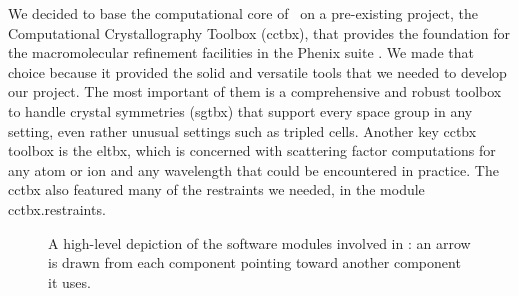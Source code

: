 \documentclass[pdf]{iucr}
\begin{document}
We decided to base the computational core of \olexrefine\ on a pre-existing project, the Computational Crystallography Toolbox (cctbx), that provides the foundation for the macromolecular refinement facilities in the Phenix suite . We made that choice because it provided the solid and versatile tools  that we needed to develop our project. The most important of them is a comprehensive and robust toolbox to handle crystal symmetries (sgtbx) that support every space group in any setting, even rather unusual settings such as tripled cells. Another key cctbx toolbox is the eltbx, which is concerned with scattering factor computations for any atom or ion and any wavelength that could be encountered in practice. The cctbx also featured many of the restraints we needed, in the module cctbx.restraints. 

\begin{figure}
\caption{A high-level depiction of the software modules involved in \olexrefine: an arrow is drawn from each component pointing toward another component it uses.}
\label{fig:software:modules}
\end{figure}
\end{document}
